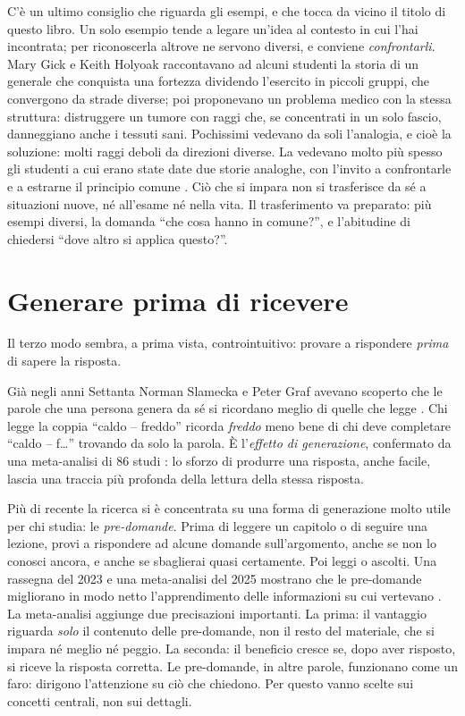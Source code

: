 C'è un ultimo consiglio che riguarda gli esempi, e che tocca da vicino
il titolo di questo libro. Un solo esempio tende a legare un'idea al
contesto in cui l'hai incontrata; per riconoscerla altrove ne servono
diversi, e conviene \emph{confrontarli}. Mary Gick e Keith Holyoak
raccontavano ad alcuni studenti la storia di un generale che conquista
una fortezza dividendo l'esercito in piccoli gruppi, che convergono da
strade diverse; poi proponevano un problema medico con la stessa
struttura: distruggere un tumore con raggi che, se concentrati in un
solo fascio, danneggiano anche i tessuti sani. Pochissimi vedevano da
soli l'analogia, e cioè la soluzione: molti raggi deboli da direzioni
diverse. La vedevano molto più spesso gli studenti a cui erano state
date due storie analoghe, con l'invito a confrontarle e a estrarne il
principio comune \parencite{gick1983}. Ciò che si impara non si
trasferisce da sé a situazioni nuove, né all'esame né nella vita. Il
trasferimento va preparato: più esempi diversi, la domanda \enquote{che
cosa hanno in comune?}, e l'abitudine di chiedersi \enquote{dove altro
si applica questo?}.

\section{Generare prima di ricevere}

Il terzo modo sembra, a prima vista, controintuitivo: provare a
rispondere \emph{prima} di sapere la risposta.

Già negli anni Settanta Norman Slamecka e Peter Graf avevano scoperto
che le parole che una persona genera da sé si ricordano meglio di
quelle che legge \parencite{slamecka1978}. Chi legge la coppia
\enquote{caldo -- freddo} ricorda \emph{freddo} meno bene di chi deve
completare \enquote{caldo -- f\dots} trovando da solo la parola. È
l'\emph{effetto di generazione}, confermato da una meta-analisi di 86
studi \parencite{bertsch2007}: lo sforzo di produrre una risposta,
anche facile, lascia una traccia più profonda della lettura della
stessa risposta.

Più di recente la ricerca si è concentrata su una forma di generazione
molto utile per chi studia: le \emph{pre-domande}. Prima di leggere un
capitolo o di seguire una lezione, provi a rispondere ad alcune domande
sull'argomento, anche se non lo conosci ancora, e anche se sbaglierai
quasi certamente. Poi leggi o ascolti. Una rassegna del 2023 e una
meta-analisi del 2025 mostrano che le pre-domande migliorano in modo
netto l'apprendimento delle informazioni su cui vertevano
\parencite{pan2023, kingshepard2025}. La meta-analisi aggiunge due
precisazioni importanti. La prima: il vantaggio riguarda \emph{solo}
il contenuto delle pre-domande, non il resto del materiale, che si
impara né meglio né peggio. La seconda: il beneficio cresce se, dopo
aver risposto, si riceve la risposta corretta. Le pre-domande, in altre
parole, funzionano come un faro: dirigono l'attenzione su ciò che
chiedono. Per questo vanno scelte sui concetti centrali, non sui
dettagli.

